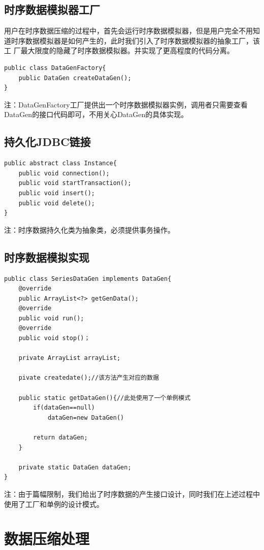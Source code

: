 \subsection{时序数据模拟器工厂}
用户在时序数据压缩的过程中，首先会运行时序数据模拟器，但是用户完全不用知道时序数据模拟器是如何产生的，此时我们引入了时序数据模拟器的抽象工厂，该工
厂最大限度的隐藏了时序数据模拟器。并实现了更高程度的代码分离。
\begin{lstlisting}
public class DataGenFactory{
	public DataGen createDataGen();
}
\end{lstlisting}
注：DataGenFactory工厂提供出一个时序数据模拟器实例，调用者只需要查看DataGen的接口代码即可，不用关心DataGen的具体实现。


\subsection{持久化JDBC链接}
\begin{lstlisting}
public abstract class Instance{
	public void connection();
	public void startTransaction();
	public void insert();
	public void delete();
}
\end{lstlisting}
注：时序数据持久化类为抽象类，必须提供事务操作。



\subsection{时序数据模拟实现}
\begin{lstlisting}
public class SeriesDataGen implements DataGen{
	@override
	public ArrayList<?> getGenData();
	@override
	public void run();
	@override
	public void stop()；

	private ArrayList arrayList;

	pivate createdate();//该方法产生对应的数据

	public static getDataGen(){//此处使用了一个单例模式
		if(dataGen==null)
			dataGen=new DataGen()
		
		return dataGen;
	}

	private static DataGen dataGen;
}
\end{lstlisting}
注：由于篇幅限制，我们给出了时序数据的产生接口设计，同时我们在上述过程中使用了工厂和单例的设计模式。




\section{数据压缩处理}
\label{4.4}
